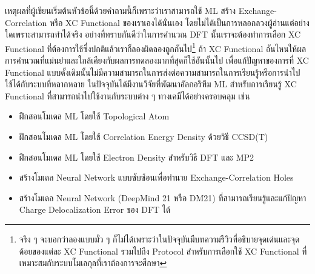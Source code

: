 เหตุผลที่ผู้เขียนเริ่มต้นหัวข้อนี้ด้วยคำถามนี้ก็เพราะว่าเราสามารถใช้ ML สร้าง Exchange-Correlation หรือ XC Functional ของเราเองได้นั่นเอง โดยไม่ได้เป็นการหลอกลวงผู้อ่านแต่อย่างใดเพราะสามารถทำได้จริง อย่างที่ทราบกันดีว่าในการคำนวณ DFT นั้นเราจะต้องทำการเลือก XC Functional ที่ต้องการใช้ซึ่งปกติแล้วเราก็ลองผิดลองถูกกันไป\footnote{จริง ๆ จะบอกว่าลองแบบมั่ว ๆ ก็ไม่ได้เพราะว่าในปัจจุบันมีบทความรีวิวที่อธิบายจุดเด่นและจุดด้อยของแต่ละ XC Functional รวมไปถึง Protocol สำหรับการเลือกใช้ XC Functional ที่เหมาะสมกับระบบโมเลกุลที่เราต้องการจะศึกษา} ถ้า XC Functional อันไหนให้ผลการคำนวณที่แม่นยำและใกล้เคียงกับผลการทดลองมากที่สุดก็ใช้อันนั้นไป เพื่อแก้ปัญหาของการที่ XC Functional แบบดั้งเดิมนั้นไม่มีความสามารถในการส่งต่อความสามารถในการเรียนรู้หรือการนำไปใช้ได้กับระบบที่หลากหลาย ในปัจจุบันได้มีงานวิจัยที่พัฒนาอัลกอริทึม ML สำหรับการเรียนรู้ XC Functional ที่สามารถนำไปใช้งานกับระบบต่าง ๆ ทางเคมีได้อย่างครอบคลุม เช่น
%
\begin{itemize}[topsep=0pt,noitemsep]\setlength\itemsep{0.5em}
    \item ฝึกสอนโมเดล ML โดยใช้ Topological Atom\autocite{mcdonagh2018}

    \item ฝึกสอนโมเดล ML โดยใช้ Correlation Energy Density ด้วยวิธี CCSD(T)\autocite{nudejima2019}

    \item ฝึกสอนโมเดล ML โดยใช้ Electron Density สำหรับวิธี DFT\autocite{dick2020} และ MP2\autocite{han2021}

    \item สร้างโมเดล Neural Network แบบซับซ้อนเพื่อทำนาย Exchange-Correlation Holes\autocite{cuierrier2021,cuierrier2022}

    \item สร้างโมเดล Neural Network (DeepMind 21 หรือ DM21) ที่สามารถเรียนรู้และแก้ปัญหา Charge Delocalization Error
          ของ DFT ได้\autocite{kirkpatrick2021}
\end{itemize}

